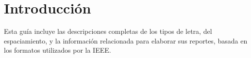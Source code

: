 \documentclass[journal,trans]{IEEEtran}
\begin{document}
\section{Introducción}
% 
% 
% 
% 
Esta guía incluye las descripciones completas de los tipos de letra, del espaciamiento, y la información relacionada para elaborar sus reportes, basada en los formatos utilizados por la IEEE.






%


%
\end{document}

